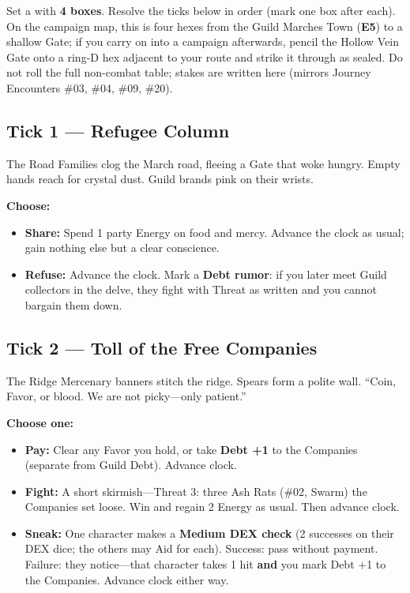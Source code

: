 Set a  with \textbf{4 boxes}. Resolve the ticks below in order (mark one box after each).
On the campaign map, this is four hexes from the Guild Marches Town (\textbf{E5}) to a shallow Gate; if you carry on into a campaign afterwards, pencil the Hollow Vein Gate onto a ring-D hex adjacent to your route and strike it through as sealed.
Do not roll the full non-combat table; stakes are written here (mirrors Journey Encounters \#03, \#04, \#09, \#20).

\subsection{Tick 1 --- Refugee Column}

\begin{rpgbox}{The Road}
    Families clog the March road, fleeing a Gate that woke hungry.
    Empty hands reach for crystal dust. Guild brands pink on their wrists.
\end{rpgbox}

\textbf{Choose:}
\begin{itemize}
    \item \textbf{Share:} Spend 1 party Energy on food and mercy. Advance the clock as usual; gain nothing else but a clear conscience.
    \item \textbf{Refuse:} Advance the clock. Mark a \textbf{Debt rumor}: if you later meet Guild collectors in the delve, they fight with Threat as written and you cannot bargain them down.
\end{itemize}

\subsection{Tick 2 --- Toll of the Free Companies}

\begin{rpgbox}{The Ridge}
    Mercenary banners stitch the ridge. Spears form a polite wall.
    ``Coin, Favor, or blood. We are not picky---only patient.''
\end{rpgbox}

\textbf{Choose one:}
\begin{itemize}
    \item \textbf{Pay:} Clear any Favor you hold, or take \textbf{Debt +1} to the Companies (separate from Guild Debt). Advance clock.
    \item \textbf{Fight:} A short skirmish---Threat 3: three Ash Rats (\#02, Swarm) the Companies set loose. Win and regain 2 Energy as usual. Then advance clock.
    \item \textbf{Sneak:} One character makes a \textbf{Medium DEX check} (2 successes on their DEX dice; the others may Aid for  each). Success: pass without payment. Failure: they notice---that character takes 1 hit \textbf{and} you mark Debt +1 to the Companies. Advance clock either way.
\end{itemize}


